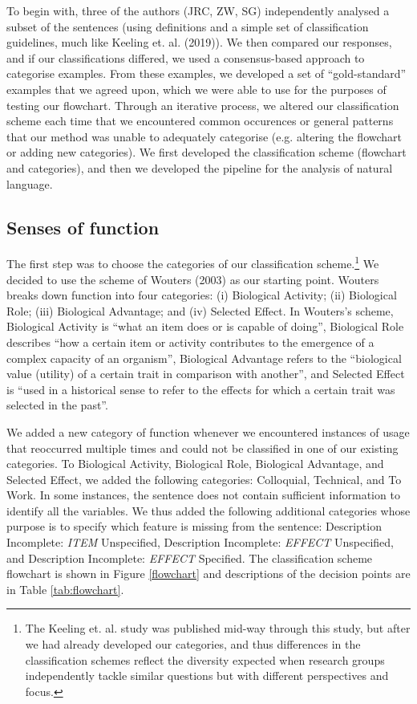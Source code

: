\documentclass{article}
\begin{document}
To begin with, three of the authors (JRC, ZW, SG) independently analysed a subset of the sentences (using definitions and a simple set of classification guidelines, much like Keeling et. al. (2019)).
We then compared our responses, and if our classifications differed, we used a consensus-based approach to categorise examples.
From these examples, we developed a set of ``gold-standard'' examples that we agreed upon, which we were able to use for the purposes of testing our flowchart.
Through an iterative process, we altered our classification scheme each time that we encountered common occurences or general patterns that our method was unable to adequately categorise (e.g. altering the flowchart or adding new categories).
We first developed the classification scheme (flowchart and categories), and then we developed the pipeline for the analysis of natural language.

\subsection{Senses of function}
\label{sec:senses-function}

The first step was to choose the categories of our classification scheme.\footnote{The Keeling et. al. study was published mid-way through this study, but after we had already developed our categories, and thus differences in the classification schemes reflect the diversity expected when research groups independently tackle similar questions but with different perspectives and focus.}
We decided to use the scheme of Wouters (2003) as our starting point.
Wouters breaks down function into four categories: (i) Biological Activity; (ii) Biological Role; (iii) Biological Advantage; and (iv) Selected Effect.
In Wouters's scheme, Biological Activity is ``what an item does or is capable of doing'', Biological Role describes ``how a certain item or activity contributes to the emergence of a complex capacity of an organism'', Biological Advantage refers to the ``biological value (utility) of a certain trait in comparison with another'', and Selected Effect is ``used in a historical sense to refer to the effects for which a certain trait was selected in the past''.

We added a new category of function whenever we encountered instances of usage that reoccurred multiple times and could not be classified in one of our existing categories.
To Biological Activity, Biological Role, Biological Advantage, and Selected Effect, we added the following categories: Colloquial, Technical, and To Work.
In some instances, the sentence does not contain sufficient information to identify all the variables.
We thus added the following additional categories whose purpose is to specify which feature is missing from the sentence: Description Incomplete: \emph{ITEM} Unspecified, Description Incomplete: \emph{EFFECT} Unspecified, and Description Incomplete: \emph{EFFECT} Specified.
The classification scheme flowchart is shown in Figure \ref{flowchart} and descriptions of the decision points are in Table \ref{tab:flowchart}.
\end{document}
